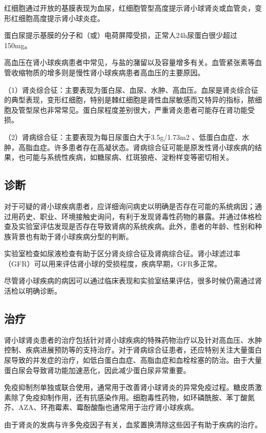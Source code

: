 红细胞通过开放的基膜表现为血尿，红细胞管型高度提示肾小球肾炎或血管炎，变形红细胞高度提示肾小球炎症。

蛋白尿提示基膜的分子和（或）电荷屏障受损，正常人24h尿蛋白很少超过150mg。

高血压在肾小球疾病患者中常见，与盐的潴留以及容量增多有关。血管紧张素等血管收缩物质的增多则是慢性肾小球疾病患者高血压的主要原因。

（1）肾炎综合征：主要表现为蛋白尿、血尿、水肿、高血压。血尿是肾炎综合征的典型表现，变形红细胞，特别是棘红细胞是肾性血尿敏感而又特异的指标，脓细胞及管型尿也非常常见。蛋白尿程度差别很大，严重肾炎患者可能存在肾功能受损。

（2）肾病综合征：主要表现为每日尿蛋白大于3.5g/1.73m{2}
、低蛋白血症、水肿，高脂血症。许多患者存在高凝状态。肾病综合征可能是原发性肾小球疾病的结果，也可能与系统性疾病，如糖尿病、红斑狼疮、淀粉样变等密切相关。

\subsection{诊断}

对于可疑的肾小球疾病患者，应详细询问病史以明确是否存在可能的系统病因；通过用药史、职业、环境接触史询问，有利于发现肾毒性药物的暴露。并通过体格检查及实验室评估发现是否存在导致肾病的系统疾病。此外，患者的年龄、性别和种族背景也有助于肾小球疾病分型的判断。

实验室检查如尿液检查有助于区分肾炎综合征及肾病综合征。肾小球滤过率（GFR）可以用来评估肾小球的受损程度，疾病早期，GFR多正常。

尽管肾小球疾病的病因可以通过临床表现和实验室结果评估，很多时候仍需通过肾活检以明确诊断。

\subsection{治疗}

肾小球肾炎患者的治疗包括针对肾小球疾病的特殊药物治疗以及针对高血压、水肿控制、疾病进展预防等的支持治疗。对于肾病综合征患者，还应特别关注大量蛋白尿导致的并发症的治疗，如低白蛋白血症、高脂血症和血栓栓塞的防治。由于大量蛋白尿会导致肾功能加速恶化，因此减少蛋白尿非常重要。

免疫抑制剂单独或联合使用，通常用于改善肾小球肾炎的异常免疫过程。糖皮质激素除了免疫抑制作用，还有抗感染作用。细胞毒性药物，如环磷酰胺、苯丁酸氮芥、AZA、环孢霉素、霉酚酸酯也通常用于治疗肾小球疾病。

由于肾炎的发病与许多免疫因子有关，血浆置换清除这些因子有助于疾病的治疗。

